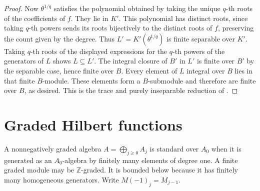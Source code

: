 \documentclass[11pt,oneside,openany]{book}
\theoremstyle{definition}
\theoremstyle{remark}
\begin{document}
\begin{proof}
Now \(\theta^{1/q}\) satisfies the polynomial obtained by taking the unique \(q\)-th roots of the coefficients of \(f\). They lie in \(K'\). This polynomial has distinct roots, since taking \(q\)-th powers sends its roots bijectively to the distinct roots of \(f\), preserving the count given by the degree. Thus \(L'=K'(\theta^{1/q})\) is finite separable over \(K'\). Taking \(q\)-th roots of the displayed expressions for the \(q\)-th powers of the generators of \(L\) shows \(L\subseteq L'\). The integral closure of \(B'\) in \(L'\) is finite over \(B'\) by the separable case, hence finite over \(B\). Every element of \(L\) integral over \(B\) lies in that finite \(B\)-module. These elements form a \(B\)-submodule and therefore are finite over \(B\), as desired. This is the trace and purely inseparable reduction of \cite[Corollary 13.13 and Proposition 13.14]{eisenbud}.
\end{proof}

\section{Graded Hilbert functions}

A nonnegatively graded algebra \(A=\bigoplus_{j\ge0}A_j\) is standard over \(A_0\) when it is generated as an \(A_0\)-algebra by finitely many elements of degree one. A finite graded module may be \(\mathbb Z\)-graded. It is bounded below because it has finitely many homogeneous generators. Write \(M(-1)_j=M_{j-1}\).
\end{document}
